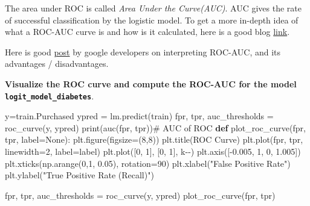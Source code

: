 \documentclass[
  letterpaper,
  DIV=11,
  numbers=noendperiod]{scrreprt}
\newenvironment{Shaded}{\begin{snugshade}}{\end{snugshade}}
\newcommand{\BuiltInTok}[1]{\textcolor[rgb]{0.00,0.23,0.31}{#1}}
\newcommand{\CommentTok}[1]{\textcolor[rgb]{0.37,0.37,0.37}{#1}}
\newcommand{\DecValTok}[1]{\textcolor[rgb]{0.68,0.00,0.00}{#1}}
\newcommand{\FloatTok}[1]{\textcolor[rgb]{0.68,0.00,0.00}{#1}}
\newcommand{\KeywordTok}[1]{\textcolor[rgb]{0.00,0.23,0.31}{\textbf{#1}}}
\newcommand{\NormalTok}[1]{\textcolor[rgb]{0.00,0.23,0.31}{#1}}
\newcommand{\OperatorTok}[1]{\textcolor[rgb]{0.37,0.37,0.37}{#1}}
\newcommand{\StringTok}[1]{\textcolor[rgb]{0.13,0.47,0.30}{#1}}
\newcommand{\VariableTok}[1]{\textcolor[rgb]{0.07,0.07,0.07}{#1}}
\begin{document}
The area under ROC is called \emph{Area Under the Curve(AUC)}. AUC gives
the rate of successful classification by the logistic model. To get a
more in-depth idea of what a ROC-AUC curve is and how is it calculated,
here is a good blog
\href{https://www.analyticsvidhya.com/blog/2020/06/auc-roc-curve-machine-learning/}{link}.

Here is good
\href{https://developers.google.com/machine-learning/crash-course/classification/roc-and-auc}{post}
by google developers on interpreting ROC-AUC, and its advantages /
disadvantages.

\textbf{Visualize the ROC curve and compute the ROC-AUC for the model
\texttt{logit\_model\_diabetes}}.

\begin{Shaded}
\begin{Highlighting}[]
\NormalTok{y}\OperatorTok{=}\NormalTok{train.Purchased}
\NormalTok{ypred }\OperatorTok{=}\NormalTok{ lm.predict(train)}
\NormalTok{fpr, tpr, auc\_thresholds }\OperatorTok{=}\NormalTok{ roc\_curve(y, ypred)}
\BuiltInTok{print}\NormalTok{(auc(fpr, tpr))}\CommentTok{\# AUC of ROC}
\KeywordTok{def}\NormalTok{ plot\_roc\_curve(fpr, tpr, label}\OperatorTok{=}\VariableTok{None}\NormalTok{):}
\NormalTok{    plt.figure(figsize}\OperatorTok{=}\NormalTok{(}\DecValTok{8}\NormalTok{,}\DecValTok{8}\NormalTok{))}
\NormalTok{    plt.title(}\StringTok{\textquotesingle{}ROC Curve\textquotesingle{}}\NormalTok{)}
\NormalTok{    plt.plot(fpr, tpr, linewidth}\OperatorTok{=}\DecValTok{2}\NormalTok{, label}\OperatorTok{=}\NormalTok{label)}
\NormalTok{    plt.plot([}\DecValTok{0}\NormalTok{, }\DecValTok{1}\NormalTok{], [}\DecValTok{0}\NormalTok{, }\DecValTok{1}\NormalTok{], }\StringTok{\textquotesingle{}k{-}{-}\textquotesingle{}}\NormalTok{)}
\NormalTok{    plt.axis([}\OperatorTok{{-}}\FloatTok{0.005}\NormalTok{, }\DecValTok{1}\NormalTok{, }\DecValTok{0}\NormalTok{, }\FloatTok{1.005}\NormalTok{])}
\NormalTok{    plt.xticks(np.arange(}\DecValTok{0}\NormalTok{,}\DecValTok{1}\NormalTok{, }\FloatTok{0.05}\NormalTok{), rotation}\OperatorTok{=}\DecValTok{90}\NormalTok{)}
\NormalTok{    plt.xlabel(}\StringTok{"False Positive Rate"}\NormalTok{)}
\NormalTok{    plt.ylabel(}\StringTok{"True Positive Rate (Recall)"}\NormalTok{)}

\NormalTok{fpr, tpr, auc\_thresholds }\OperatorTok{=}\NormalTok{ roc\_curve(y, ypred)}
\NormalTok{plot\_roc\_curve(fpr, tpr)}
\end{Highlighting}
\end{Shaded}
\end{document}
